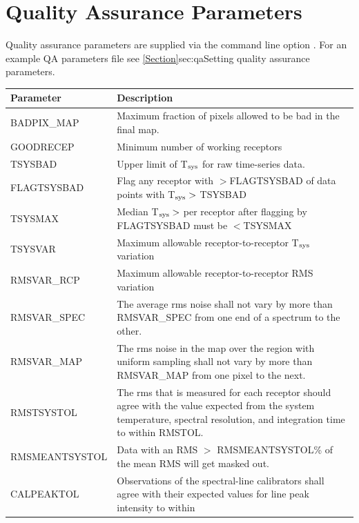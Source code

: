 \documentclass[11pt,oneside,chapters]{starlink}
\begin{document}
\chapter{Quality Assurance Parameters}
\label{app:qa}
Quality assurance parameters are supplied via the command line option
. For an example QA parameters file see
\cref{Section}{sec:qa}{Setting quality assurance parameters}.
\begin{table}[h!]
\begin{tabular}{|p{4.0cm}|p{11.0cm}|}
\hline
\textbf{Parameter} & \textbf{Description} \\
\hline
BADPIX\_MAP    & Maximum fraction of pixels allowed to be bad in the final map. \\
GOODRECEP      & Minimum number of working receptors \\
TSYSBAD        & Upper limit of T$_{\textnormal{sys}}$ for raw time-series data.\\
FLAGTSYSBAD    & Flag any receptor with $>$FLAGTSYSBAD of data points with
                 T$_{\textnormal{sys}}>$ TSYSBAD \\
TSYSMAX        & Median T$_{\textnormal{sys}}>$ per receptor after flagging by FLAGTSYSBAD
                 must be $<$TSYSMAX \\
TSYSVAR        & Maximum allowable receptor-to-receptor T$_{\textnormal{sys}}$ variation \\
RMSVAR\_RCP    & Maximum allowable receptor-to-receptor RMS variation \\
RMSVAR\_SPEC   & The average rms noise shall not vary by more than RMSVAR\_SPEC
                 from one end of a spectrum to the other. \\
RMSVAR\_MAP    & The rms noise in the map over the region with uniform sampling
                 shall not vary by more than RMSVAR\_MAP from one pixel to the
                 next. \\
RMSTSYSTOL     & The rms that is measured for each receptor should agree with the
                 value expected from the system temperature, spectral resolution,
                 and integration time to within RMSTOL. \\
RMSMEANTSYSTOL & Data with an RMS $>$ RMSMEANTSYSTOL\% of the mean RMS will get
                 masked out. \\
CALPEAKTOL     & Observations of the spectral-line calibrators shall agree with
                 their expected values for line peak intensity to within

\end{tabular}
\end{table}
\end{document}
